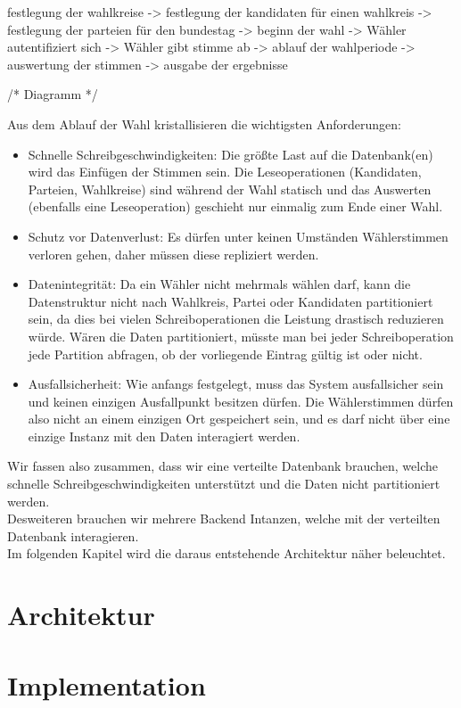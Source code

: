 \documentclass{article}  %
\begin{document}
festlegung der wahlkreise -> festlegung der kandidaten für einen wahlkreis -> festlegung der parteien für den bundestag -> beginn der wahl -> Wähler autentifiziert sich -> Wähler gibt stimme ab -> ablauf der wahlperiode -> auswertung der stimmen -> ausgabe der ergebnisse

/* Diagramm */ 

Aus dem Ablauf der Wahl kristallisieren die wichtigsten Anforderungen: \\
\begin{itemize}
    \item Schnelle Schreibgeschwindigkeiten: Die größte Last auf die Datenbank(en) wird das Einfügen der Stimmen sein. Die Leseoperationen (Kandidaten, Parteien, Wahlkreise) sind während der Wahl statisch und das Auswerten (ebenfalls eine Leseoperation) geschieht nur einmalig zum Ende einer Wahl. 

    \item Schutz vor Datenverlust: Es dürfen unter keinen Umständen Wählerstimmen verloren gehen, daher müssen diese repliziert werden.

    \item Datenintegrität: Da ein Wähler nicht mehrmals wählen darf, kann die Datenstruktur nicht nach Wahlkreis, Partei oder Kandidaten partitioniert sein, da dies bei vielen Schreiboperationen die Leistung drastisch reduzieren würde. Wären die Daten partitioniert, müsste man bei jeder Schreiboperation jede Partition abfragen, ob der vorliegende Eintrag gültig ist oder nicht.

    \item Ausfallsicherheit: Wie anfangs festgelegt, muss das System ausfallsicher sein und keinen einzigen Ausfallpunkt besitzen dürfen. Die Wählerstimmen dürfen also nicht an einem einzigen Ort gespeichert sein, und es darf nicht über eine einzige Instanz mit den Daten interagiert werden.
 
\end{itemize} 

Wir fassen also zusammen, dass wir eine verteilte Datenbank brauchen, welche schnelle Schreibgeschwindigkeiten unterstützt und die Daten nicht partitioniert werden. \\
Desweiteren brauchen wir mehrere Backend Intanzen, welche mit der verteilten Datenbank interagieren. \\

Im folgenden Kapitel wird die daraus entstehende Architektur näher beleuchtet.

\newpage
\section{Architektur}



\newpage
\section{Implementation}
\newpage
\end{document}
